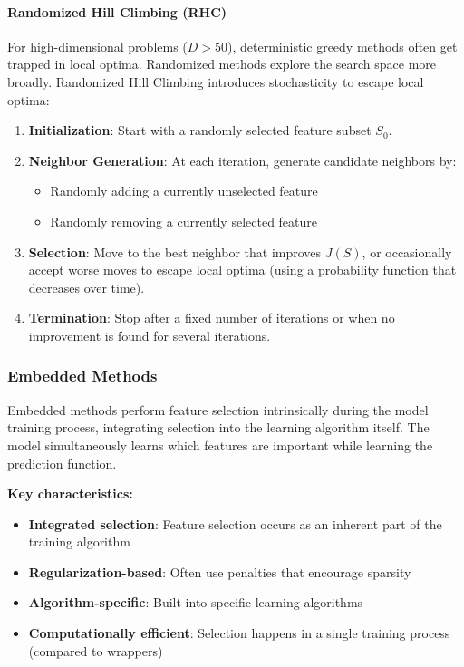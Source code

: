 \paragraph{Randomized Hill Climbing (RHC)}

For high-dimensional problems ($D > 50$), deterministic greedy methods often get trapped in local optima. Randomized methods explore the search space more broadly.
Randomized Hill Climbing introduces stochasticity to escape local optima:

\begin{enumerate}
    \item \textbf{Initialization}: Start with a randomly selected feature subset $S_0$.
    \item \textbf{Neighbor Generation}: At each iteration, generate candidate neighbors by:
    \begin{itemize}
        \item Randomly adding a currently unselected feature
        \item Randomly removing a currently selected feature
    \end{itemize}
    \item \textbf{Selection}: Move to the best neighbor that improves $J(S)$, or occasionally accept worse moves to escape local optima (using a probability function that decreases over time).
    \item \textbf{Termination}: Stop after a fixed number of iterations or when no improvement is found for several iterations.
\end{enumerate}
\subsubsection*{Embedded Methods}

Embedded methods perform feature selection \alert{intrinsically during the model training process}, integrating selection into the learning algorithm itself. The model simultaneously learns which features are important while learning the prediction function.

\textbf{Key characteristics:}
\begin{itemize}
\item \textbf{Integrated selection}: Feature selection occurs as an inherent part of the training algorithm
\item \textbf{Regularization-based}: Often use penalties that encourage sparsity
\item \textbf{Algorithm-specific}: Built into specific learning algorithms
\item \textbf{Computationally efficient}: Selection happens in a single training process (compared to wrappers)
\end{itemize}

